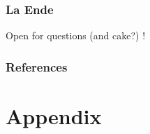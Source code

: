\documentclass[aspectratio=169]{beamer}
\begin{document}
\begin{frame}[fragile]
	\frametitle{La Ende}
    \Large Open for questions (and cake?) ! 
\end{frame}


\begin{frame}
	\frametitle{References}
    
    \tiny
	
\end{frame}




\section{Appendix}
\end{document}
